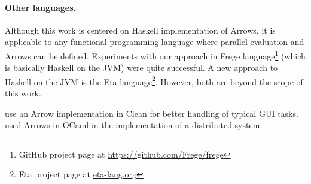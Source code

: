 \paragraph{Other languages.}
Although this work is centered on Haskell implementation of Arrows, it is applicable to any functional programming language where parallel evaluation and Arrows can be defined. Experiments with our approach in Frege language\footnote{GitHub project page at \url{https://github.com/Frege/frege}} (which is basically Haskell on the JVM) were quite successful. A new approach to Haskell on the JVM is the Eta language\footnote{Eta project page at \url{eta-lang.org}}. However, both are beyond the scope of this work.

\citet{achten2004arrows,achten2007arrow} use an Arrow implementation in Clean for better handling of typical GUI tasks. \citet{Dagand:2009:ORD:1481861.1481870} used Arrows in OCaml in the implementation of a distributed system.


